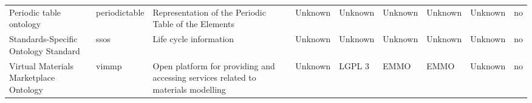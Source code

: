 \begin{table}
\begin{tabular}{m{5cm}m{2cm}m{5cm}m{2cm}m{2cm}m{2cm}m{2cm}m{2cm}m{2cm}}
                                                          Periodic table ontology &           periodictable &                              Representation of the Periodic Table of the Elements &              Unknown &      Unknown &                      Unknown &           Unknown &    Unknown &               no \\
                        Standards-Specific Ontology Standard &                    ssos &                                                            Life cycle information &              Unknown &      Unknown &                      Unknown &           Unknown &    Unknown &               no \\
                     Virtual Materials Marketplace Ontology &                   vimmp & Open platform for providing and accessing services related to materials modelling &              Unknown &       LGPL 3 &                         EMMO &              EMMO &    Unknown &               no \\
\bottomrule
\end{tabular}
\end{table}
